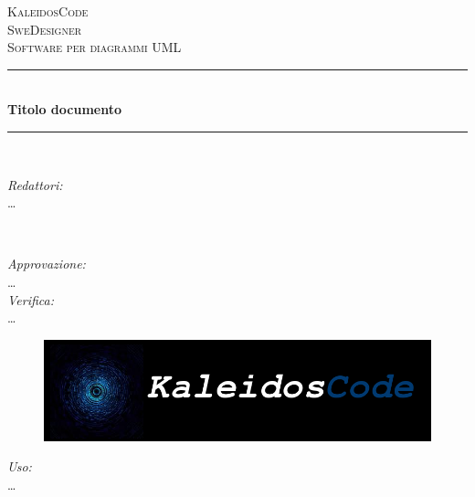 \documentclass[a4paper]{report}
\begin{document}
	
	\begin{titlepage}
		\newcommand{\HRule}{\rule{\linewidth}{0.5mm}} 
		\center  
		
		\textsc{\LARGE KaleidosCode}\\[1.5cm] 
		\textsc{\Large SweDesigner}\\[0.5cm] 
		\textsc{\large Software per diagrammi UML}\\[0.5cm]
		
		
		\HRule \\[0.4cm]
		{ \huge \bfseries Titolo documento}\\[0.4cm] 
		\HRule \\[1.5cm]
		
		\begin{minipage}{0.4\textwidth}
			\begin{flushleft} \large
				\emph{Redattori:}\\
				\dots
			\end{flushleft}
		\end{minipage}
		~
		\begin{minipage}{0.4\textwidth}
			\begin{flushright} \large
				\emph{Approvazione:} \\
				\dots \\
				\emph{Verifica:} \\
				\dots
			\end{flushright}
		\end{minipage}
		
		\begin{figure}[H]
			\centering
			\includegraphics[width=\textwidth]{Figures/KaleidosCodeLogo.png}
		\end{figure}
		
		\begin{minipage}{0.4\textwidth}
			\begin{flushleft} \large
				\emph{Uso:}\\
				\dots \\
				

\end{flushleft}
\end{minipage}
\end{titlepage}
\end{document}
